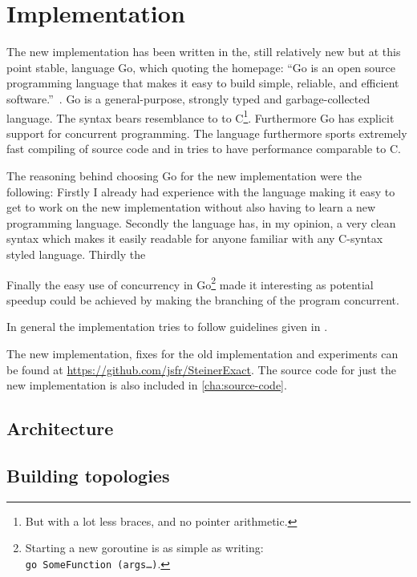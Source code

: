 {
\abnormalparskip{0pt}
\chapter{Implementation}
\label{cha:implementation}
}

The new implementation has been written in the, still relatively new but at this
point stable, language Go, which quoting the homepage: ``Go is an open source
programming language that makes it easy to build simple, reliable, and efficient
software.''~\cite{golanghomepage}. Go is a general-purpose, strongly typed and
garbage-collected language. The syntax bears resemblance to to C\footnote{But
  with a lot less braces, and no pointer arithmetic.}. Furthermore Go has
explicit support for concurrent programming. The language furthermore sports
extremely fast compiling of source code and in tries to have performance
comparable to C.

The reasoning behind choosing Go for the new implementation were the following:
Firstly I already had experience with the language making it easy to get to work
on the new implementation without also having to learn a new programming
language. Secondly the language has, in my opinion, a very clean syntax which
makes it easily readable for anyone familiar with any C-syntax styled
language. Thirdly the

Finally the easy use of concurrency in Go\footnote{Starting a new goroutine is
  as simple as writing: \texttt{go~SomeFunction~(args\ldots)}.} made it
interesting as potential speedup could be achieved by making the branching
of the program concurrent.

In general the implementation tries to follow guidelines given in
\textcite{effectivego}.

The new implementation, fixes for the old implementation and experiments can be
found at \url{https://github.com/jsfr/SteinerExact}. The source
code for just the new implementation is also included in \cref{cha:source-code}.


\section{Architecture}
\label{sec:architecture-1}


\section{Building topologies}
\label{sec:building-topologies}


